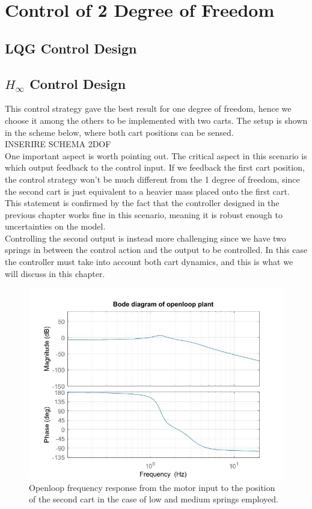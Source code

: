\chapter{Control of 2 Degree of Freedom}

\section{LQG Control Design}
\section{$H_\infty$ Control Design}
This control strategy gave the best result for one degree of freedom, hence we choose it among the others to be implemented with two carts. The setup is shown in the scheme below, where both cart positions can be sensed.\\

INSERIRE SCHEMA 2DOF\\

One important aspect is worth pointing out. The critical aspect in this scenario is which output feedback to the control input. If we feedback the first cart position, the control strategy won't be much different from the 1 degree of freedom, since the second cart is just equivalent to a heavier mass placed onto the first cart. This statement is confirmed by the fact that the controller designed in the previous chapter works fine in this scenario, meaning it is robust enough to uncertainties on the model.\\

Controlling the second output is instead more challenging since we have two springs in between the control action and the output to be controlled. In this case the controller must take into account both cart dynamics, and this is what we will discuss in this chapter.\\

\begin{figure}[h]
\centering
\includegraphics[width=0.5\linewidth]{img/bode_ol}
\caption{Openloop frequency response from the motor input to the position of the second cart in the case of low and medium springs employed.}
\label{fig:bodeol}
\end{figure}

